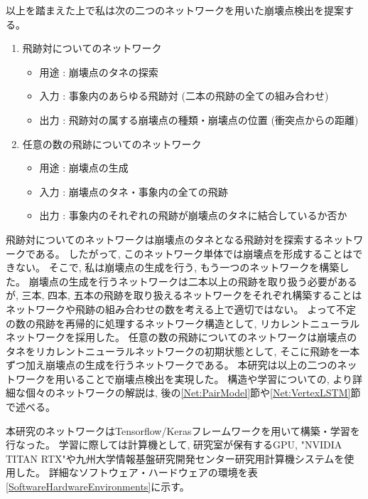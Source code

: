 以上を踏まえた上で私は次の二つのネットワークを用いた崩壊点検出を提案する。

\begin{enumerate}
 \item 飛跡対についてのネットワーク
 \begin{itemize}
  \item 用途 : 崩壊点のタネの探索
  \item 入力 : 事象内のあらゆる飛跡対 (二本の飛跡の全ての組み合わせ)
  \item 出力 : 飛跡対の属する崩壊点の種類・崩壊点の位置 (衝突点からの距離)
 \end{itemize}
 \item 任意の数の飛跡についてのネットワーク
 \begin{itemize}
  \item 用途 : 崩壊点の生成
  \item 入力 : 崩壊点のタネ・事象内の全ての飛跡
  \item 出力 : 事象内のそれぞれの飛跡が崩壊点のタネに結合しているか否か
 \end{itemize}
\end{enumerate}

飛跡対についてのネットワークは崩壊点のタネとなる飛跡対を探索するネットワークである。
したがって, このネットワーク単体では崩壊点を形成することはできない。
そこで, 私は崩壊点の生成を行う, もう一つのネットワークを構築した。
崩壊点の生成を行うネットワークは二本以上の飛跡を取り扱う必要があるが, 三本, 四本, 五本の飛跡を取り扱えるネットワークをそれぞれ構築することはネットワークや飛跡の組み合わせの数を考える上で適切ではない。
よって不定の数の飛跡を再帰的に処理するネットワーク構造として, リカレントニューラルネットワークを採用した。
任意の数の飛跡についてのネットワークは崩壊点のタネをリカレントニューラルネットワークの初期状態として, そこに飛跡を一本ずつ加え崩壊点の生成を行うネットワークである。
本研究は以上の二つのネットワークを用いることで崩壊点検出を実現した。
構造や学習についての, より詳細な個々のネットワークの解説は, 後の\ref{Net:PairModel}節や\ref{Net:VertexLSTM}節で述べる。

本研究のネットワークはTensorflow/Kerasフレームワークを用いて構築・学習を行なった。
学習に際しては計算機として, 研究室が保有するGPU, "NVIDIA TITAN RTX"や九州大学情報基盤研究開発センター研究用計算機システムを使用した。
詳細なソフトウェア・ハードウェアの環境を表\ref{SoftwareHardwareEnvironments}に示す。

